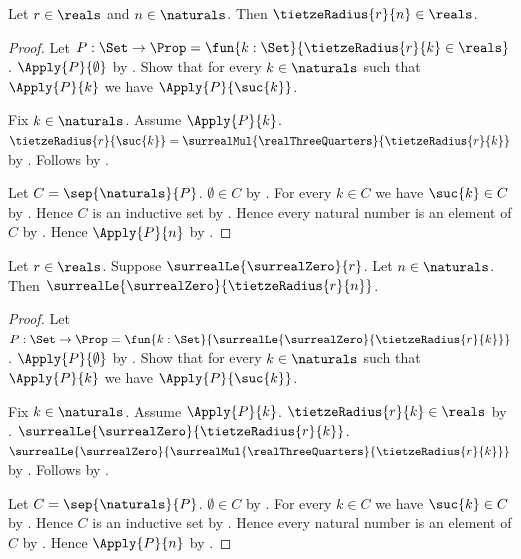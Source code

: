 \begin{theorem}\label{tietze_radius_is_real}
    Let $r\in\reals$ and $n\in\naturals$.
    Then $\tietzeRadius{r}{n}\in\reals$.
\end{theorem}
\begin{proof}
    Let $P:\Set\to\Prop=\fun{k:\Set}{\tietzeRadius{r}{k}\in\reals}$.
    $\Apply{P}{\emptyset}$ by .
    Show that for every $k\in\naturals$ such that $\Apply{P}{k}$
        we have $\Apply{P}{\suc{k}}$.
    \begin{subproof}
        Fix $k\in\naturals$.
        Assume $\Apply{P}{k}$.
        $\tietzeRadius{r}{\suc{k}}
            =\surrealMul{\realThreeQuarters}{\tietzeRadius{r}{k}}$
            by .
        Follows by
            .
    \end{subproof}
    Let $C=\sep{\naturals}{P}$.
    $\emptyset\in C$ by .
    For every $k\in C$ we have $\suc{k}\in C$
        by .
    Hence $C$ is an inductive set by .
    Hence every natural number is an element of $C$
        by .
    Hence $\Apply{P}{n}$ by .
\end{proof}

\begin{theorem}\label{tietze_radius_nonnegative}
    Let $r\in\reals$.
    Suppose $\surrealLe{\surrealZero}{r}$.
    Let $n\in\naturals$.
    Then $\surrealLe{\surrealZero}{\tietzeRadius{r}{n}}$.
\end{theorem}
\begin{proof}
    Let $P:\Set\to\Prop=\fun{k:\Set}{
        \surrealLe{\surrealZero}{\tietzeRadius{r}{k}}}$.
    $\Apply{P}{\emptyset}$ by .
    Show that for every $k\in\naturals$ such that $\Apply{P}{k}$
        we have $\Apply{P}{\suc{k}}$.
    \begin{subproof}
        Fix $k\in\naturals$.
        Assume $\Apply{P}{k}$.
        $\tietzeRadius{r}{k}\in\reals$
            by .
        $\surrealLe{\surrealZero}{\tietzeRadius{r}{k}}$.
        $\surrealLe{\surrealZero}
            {\surrealMul{\realThreeQuarters}{\tietzeRadius{r}{k}}}$
            by .
        Follows by .
    \end{subproof}
    Let $C=\sep{\naturals}{P}$.
    $\emptyset\in C$ by .
    For every $k\in C$ we have $\suc{k}\in C$
        by .
    Hence $C$ is an inductive set by .
    Hence every natural number is an element of $C$
        by .
    Hence $\Apply{P}{n}$ by .
\end{proof}

